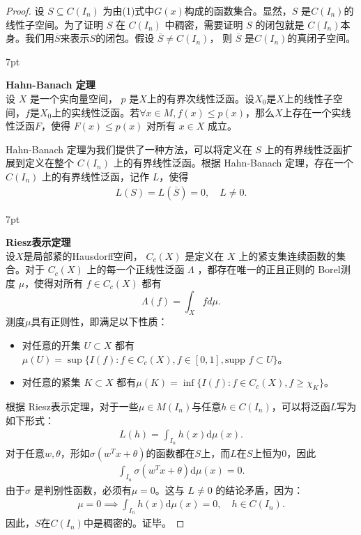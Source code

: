 \documentclass[12pt]{article}
\newenvironment{formal}{%
\def\FrameCommand{%
\hspace{1pt}%
{\color{Blue}\vrule width 2pt}%
{\color{formalshade}\vrule width 4pt}%
\colorbox{formalshade}%
}%
\MakeFramed{\advance\hsize-\width\FrameRestore}%
\noindent\hspace{-4.55pt}%
\begin{adjustwidth}{}{7pt}%
\vspace{2pt}\vspace{2pt}%
}
{%
\vspace{2pt}\end{adjustwidth}\endMakeFramed%
}
\begin{document}
\begin{proof}
    设 $S \subseteq C(I_n)$ 为由(1)式中$G(x)$构成的函数集合。显然，$S$ 是$C(I_n)$的线性子空间。为了证明 $S$ 在 $C(I_n)$ 中稠密，需要证明 $S$ 的闭包就是 $C(I_n)$本身。我们用$\overline{S}$来表示$S$的闭包。假设 $\overline{S}\neq C(I_n)$， 则 $\overline{S}$ 是$C(I_n)$的真闭子空间。

\begin{formal}
\textbf{Hahn-Banach 定理}\\
设 $X$ 是一个实向量空间， $p$ 是$X$上的有界次线性泛函。设$X_0$是$X$上的线性子空间，$f$是$X_0$上的实线性泛函。若$\forall x \in M, f(x) \leq p(x)$，那么$X$上存在一个实线性泛函$F$，使得  $F(x) \leq p(x)$  对所有  $x \in X$  成立。
\end{formal}

Hahn-Banach 定理为我们提供了一种方法，可以将定义在 $S$ 上的有界线性泛函扩展到定义在整个 $C(I_n)$ 上的有界线性泛函。根据 Hahn-Banach 定理，存在一个 $C(I_n)$ 上的有界线性泛函，记作 $L$，使得
\begin{align*}
    L(S)=L(\overline{S})=0,\quad L\neq 0.
\end{align*}

\begin{formal}
\textbf{Riesz表示定理}\\
设$X$是局部紧的Hausdorff空间， $C_c(X)$ 是定义在 $X$ 上的紧支集连续函数的集合。对于 $C_c(X)$ 上的每一个正线性泛函 $\Lambda$ ，都存在唯一的正且正则的 Borel测度 $\mu$，使得对所有  $f \in C_c(X)$ 都有
$$\Lambda(f) = \int_X f d\mu.$$
测度$\mu$具有正则性，即满足以下性质：
\begin{itemize}
    \item 对任意的开集 \( U \subset X \) 都有$
    \mu(U) = \sup \{ I(f) : f \in C_c(X), f \in [0,1], \text{supp } f \subset U \}$。
    \item 对任意的紧集 \( K \subset X \) 都有$
    \mu(K) = \inf \{ I(f) : f \in C_c(X), f \geq \chi_K \}$。
\end{itemize}
\end{formal}
根据 Riesz表示定理，对于一些$\mu\in M(I_n)$与任意$h\in C(I_n)$，可以将泛函$L$写为如下形式：
\begin{align*}
    L(h)=\int_{I_n} h(x)\mathrm{d}\mu(x).
\end{align*}
对于任意$w,\theta$，形如$\sigma(w^Tx+\theta)$的函数都在$S$上，而$L$在$S$上恒为0，因此
\begin{align*}
    \int_{I_n} \sigma(w^Tx+\theta)\mathrm{d}\mu(x)=0.
\end{align*}
由于$\sigma$ 是判别性函数，必须有$\mu=0$。这与 $L\neq 0$ 的结论矛盾，因为：
\begin{align*}
    \mu=0 \implies \int_{I_n} h(x)\mathrm{d}\mu(x)=0,\quad h\in C(I_n).
\end{align*}
因此，$S$在$C(I_n)$中是稠密的。证毕。

\end{proof}
\end{document}

